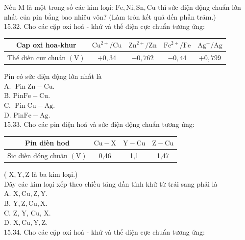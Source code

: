 \documentclass[10pt]{article}
\begin{document}
Nếu M là một trong số các kim loại: $\mathrm{Fe}, \mathrm{Ni}, \mathrm{Sn}, \mathrm{Cu}$ thì sức điện động chuẩn lớn nhất của pin bằng bao nhiêu vôn? (Làm tròn kết quả đến phần trăm.)\\
15.32. Cho các cặp oxi hoá - khử và thế điện cực chuẩn tương ứng:

\begin{center}
\begin{tabular}{|cc|c|c|c|}
\hline
Cap oxi hoa-khur & $\mathrm{Cu}^{2+} / \mathrm{Cu}$ & $\mathrm{Zn}^{2+} / \mathrm{Zn}$ & $\mathrm{Fe}^{2+} / \mathrm{Fe}$ & $\mathrm{Ag}^{+} / \mathrm{Ag}$ \\
\hline
Thé dièn cur chuán $(\mathrm{V})$ & $+0,34$ & $-0,762$ & $-0,44$ & $+0,799$ \\
\hline
\end{tabular}
\end{center}

Pin có sức điện động lớn nhất là\\
A. $\operatorname{Pin} \mathrm{Zn}-\mathrm{Cu}$.\\
B. $\mathrm{Pin} \mathrm{Fe}-\mathrm{Cu}$.\\
C. $\operatorname{Pin} \mathrm{Cu}-\mathrm{Ag}$.\\
D. $\mathrm{Pin} \mathrm{Fe}-\mathrm{Ag}$.\\
15.33. Cho các pin điện hoá và sức điện động chuẩn tương ứng:

\begin{center}
\begin{tabular}{|c|c|c|c|}
\hline
Pin dièn hod & $\mathrm{Cu}-\mathrm{X}$ & $\mathrm{Y}-\mathrm{Cu}$ & $\mathrm{Z}-\mathrm{Cu}$ \\
\hline
Sic dièn dóng chuân $(\mathrm{V})$ & 0,46 & 1,1 & 1,47 \\
\hline
\end{tabular}
\end{center}

( $\mathrm{X}, \mathrm{Y}, \mathrm{Z}$ là ba kim loại.)\\
Dãy các kim loại xếp theo chiều tăng dần tính khử từ trái sang phải là\\
A. $\mathrm{X}, \mathrm{Cu}, \mathrm{Z}, \mathrm{Y}$.\\
B. $\mathrm{Y}, \mathrm{Z}, \mathrm{Cu}, \mathrm{X}$.\\
C. Z, Y, Cu, X.\\
D. $\mathrm{X}, \mathrm{Cu}, \mathrm{Y}, \mathrm{Z}$.\\
15.34. Cho các cặp oxi hoá - khử và thế điện cực chuẩn tương ứng:
\end{document}

